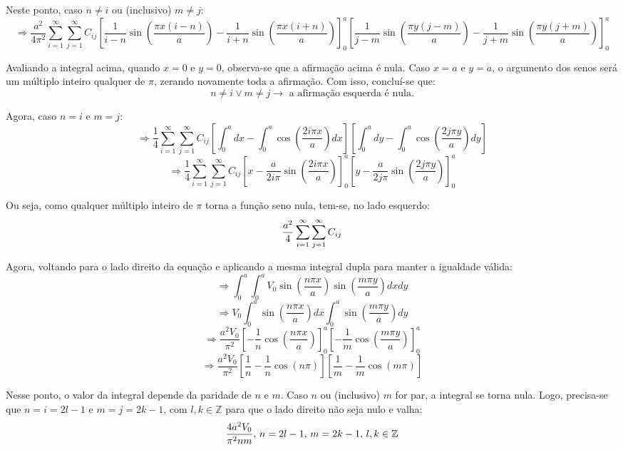 \documentclass{report}
\begin{document}
Neste ponto, caso $ n \neq i $ ou (inclusivo) $ m \neq j $:
$$ \scriptstyle \Rightarrow \frac{a^2}{4\pi^2} \sum_{i=1}^{\infty} \sum_{j=1}^{\infty} C_{ij} \left[\frac{1}{i - n}\sin\left(\frac{\pi x(i - n)}{a}\right) - \frac{1}{i + n}\sin\left(\frac{\pi x(i + n)}{a}\right)\right]_{0}^{a} \left[\frac{1}{j - m}\sin\left(\frac{\pi y(j - m)}{a}\right) - \frac{1}{j + m}\sin\left(\frac{\pi y(j + m)}{a}\right)\right]_{0}^{a} $$

Avaliando a integral acima, quando $ x = 0 $ e $ y = 0 $, observa-se que a afirmação acima é nula. Caso $ x = a $ e $ y = a $, o argumento dos senos será um múltiplo inteiro qualquer de $ \pi $, zerando novamente toda a afirmação. Com isso, concluí-se que:
$$ n \neq i \lor m \neq j \rightarrow \text{ a afirmação esquerda é nula.} $$

Agora, caso $ n = i $ e $ m = j $:
$$ \Rightarrow \frac{1}{4} \sum_{i=1}^{\infty} \sum_{j=1}^{\infty} C_{ij} \left[\int_{0}^{a}dx - \int_{0}^{a}\cos\left(\frac{2i\pi x}{a}\right)dx\right]\left[\int_{0}^{a}dy - \int_{0}^{a}\cos\left(\frac{2j\pi y}{a}\right)dy\right] $$
$$ \Rightarrow \frac{1}{4} \sum_{i=1}^{\infty} \sum_{j=1}^{\infty} C_{ij} \left[x - \frac{a}{2i\pi}\sin\left(\frac{2i\pi x}{a}\right)\right]_{0}^{a}\left[y - \frac{a}{2j\pi}\sin\left(\frac{2j\pi y}{a}\right)\right]_{0}^{a} $$

Ou seja, como qualquer múltiplo inteiro de $ \pi $ torna a função seno nula, tem-se, no lado esquerdo:
\begin{equation}
  \label{eq:Cij_left}
  \centering
  \frac{a^2}{4} \sum_{i=1}^{\infty} \sum_{j=1}^{\infty} C_{ij}
\end{equation}

Agora, voltando para o lado direito da equação e aplicando a mesma integral dupla para manter a igualdade válida:
$$ \Rightarrow \int_{0}^{a} \int_{0}^{a} V_0\sin\left(\frac{n\pi x}{a}\right)\sin\left(\frac{m\pi y}{a}\right)dxdy $$
$$ \Rightarrow V_0 \int_{0}^{a} \sin\left(\frac{n\pi x}{a}\right)dx \int_{0}^{a} \sin\left(\frac{m\pi y}{a}\right)dy $$
$$ \Rightarrow \frac{a^2V_0}{\pi^2} \left[-\frac{1}{n}\cos\left(\frac{n\pi x}{a}\right)\right]_{0}^{a} \left[-\frac{1}{m}\cos\left(\frac{m\pi y}{a}\right)\right]_{0}^{a} $$
$$ \Rightarrow \frac{a^2V_0}{\pi^2} \left[\frac{1}{n} - \frac{1}{n}\cos\left(n\pi\right)\right] \left[\frac{1}{m} - \frac{1}{m}\cos\left(m\pi\right)\right] $$

Nesse ponto, o valor da integral depende da paridade de $ n $ e $ m $. Caso $ n $ ou (inclusivo) $ m $ for par, a integral se torna nula. Logo, precisa-se que $ n = i = 2l - 1 $ e $ m = j = 2k - 1 $, com $ l, k \in \mathbb{Z} $ para que o lado
direito não seja nulo e valha:
\begin{equation}
  \label{eq:Cij_right}
  \centering
  \frac{4a^2V_0}{\pi^2 nm},\, n = 2l - 1,\, m = 2k - 1,\, l, k \in \mathbb{Z}
\end{equation}
\end{document}
